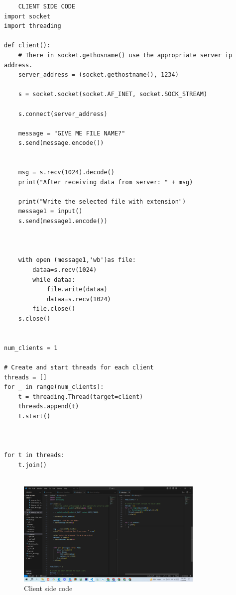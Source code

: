 \documentclass[11pt]{article}
\begin{document}
\begin{itemize}
    \begin{verbatim}
    CLIENT SIDE CODE
import socket
import threading

def client():
    # There in socket.gethosname() use the appropriate server ip address.
    server_address = (socket.gethostname(), 1234)

    s = socket.socket(socket.AF_INET, socket.SOCK_STREAM)

    s.connect(server_address)

    message = "GIVE ME FILE NAME?"
    s.send(message.encode())


    msg = s.recv(1024).decode()
    print("After receiving data from server: " + msg)

    print("Write the selected file with extension")
    message1 = input()
    s.send(message1.encode())

   

    with open (message1,'wb')as file:
        dataa=s.recv(1024)
        while dataa:
            file.write(dataa)
            dataa=s.recv(1024)
        file.close()
    s.close()


num_clients = 1

# Create and start threads for each client
threads = []
for _ in range(num_clients):
    t = threading.Thread(target=client)
    threads.append(t)
    t.start()
    


for t in threads:
    t.join()
    
\end{verbatim}
    \begin{figure}[H]
        \centering
        \includegraphics[width=0.8\textwidth]{client.png}
        \caption{Client side code}
        \label{fig:1}
    \end{figure}
    

\end{itemize}
\end{document}
